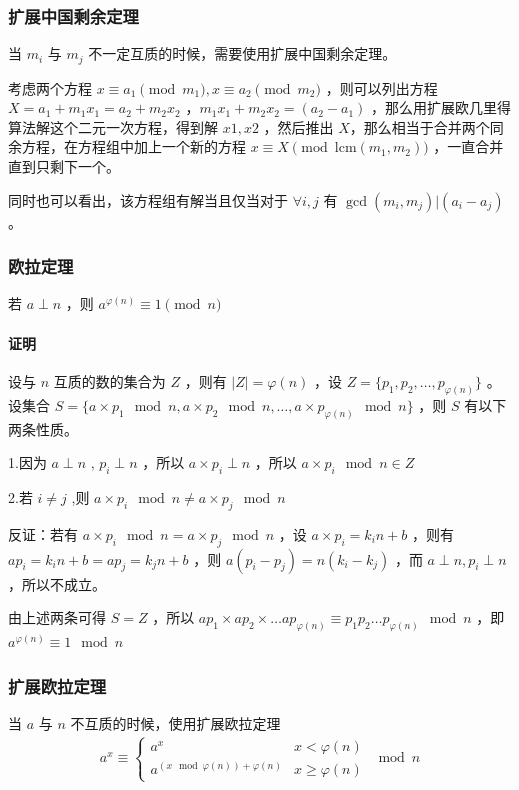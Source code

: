 \documentclass[UTF-8]{ctexart}
\begin{document}
			\subsubsection{扩展中国剩余定理}
			当 $m _ i$ 与 $m _  j$ 不一定互质的时候，需要使用扩展中国剩余定理。
	
			考虑两个方程 $x \equiv a _ 1 \pmod{m _ 1},x \equiv a _ 2 \pmod{m _ 2}$ ，则可以列出方程 $X=a _ 1+m _ 1x _ 1=a _ 2+m _ 2 x _ 2$ ，$m _ 1 x _ 1+m _ 2 x _ 2=(a _ 2-a _ 1)$ ，那么用扩展欧几里得算法解这个二元一次方程，得到解 $x1,x2$ ，然后推出 $X$，那么相当于合并两个同余方程，在方程组中加上一个新的方程 $x \equiv X \pmod{\mbox{lcm}(m _ 1,m _ 2)}$ ，一直合并直到只剩下一个。  
	
			同时也可以看出，该方程组有解当且仅当对于 $\forall i,j$ 有 $\gcd(m _ i,m _ j)|(a _ i-a _ j)$ 。
			\subsubsection{欧拉定理}
			若 $a \perp n$ ，则 $a^{\varphi(n)} \equiv 1\pmod{n}$
			\paragraph{证明}
			设与 $n$ 互质的数的集合为 $Z$ ，则有 $|Z|=\varphi(n)$ ，设 $Z=\lbrace p _ 1,p _ 2,\dots,p _ {\varphi(n)}\rbrace$ 。设集合 $S=\lbrace a \times p _ 1 \mod{n},a \times p _ 2 \mod{n},\dots,a \times p _ {\varphi(n)} \mod{n} \rbrace$ ，则 $S$ 有以下两条性质。
	
			1.因为 $a \perp n$ , $p _ i \perp n$ ，所以 $a \times p _ i \perp n$ ，所以 $a \times p _ i \mod{n} \in Z$
	
			2.若 $i \neq j$ ,则 $a \times p _ i \mod{n} \neq a \times p _ j \mod{n}$ 
	
			反证：若有 $a \times p _ i \mod{n} = a \times p _ j \mod{n}$ ，设 $a \times p _ i=k _ in+b$ ，则有 $a p _ i=k _ in+b=ap _ j=k _ jn+b$ ，则 $a(p _ i-p _ j)=n(k _ i-k _ j)$ ，而 $a \perp n,p _ i \perp n$ ，所以不成立。
	
			由上述两条可得 $S=Z$ ，所以 $ap _ 1 \times ap _ 2 \times \dots ap _ {\varphi(n)} \equiv p _ 1 p _ 2 \dots p _ {\varphi(n)} \mod{n}$ ，即 $a^{\varphi(n)} \equiv 1 \mod{n}$ 
			\subsubsection{扩展欧拉定理}
			当 $a$ 与 $n$ 不互质的时候，使用扩展欧拉定理
			\begin{align}
			a ^ x \equiv \begin{cases} a ^ x & x < \varphi(n) \nonumber\\ a ^ {(x \mod \varphi(n))+\varphi(n)} & x \ge \varphi(n) \end{cases} \mod n\nonumber
			\end{align}
\end{document}
